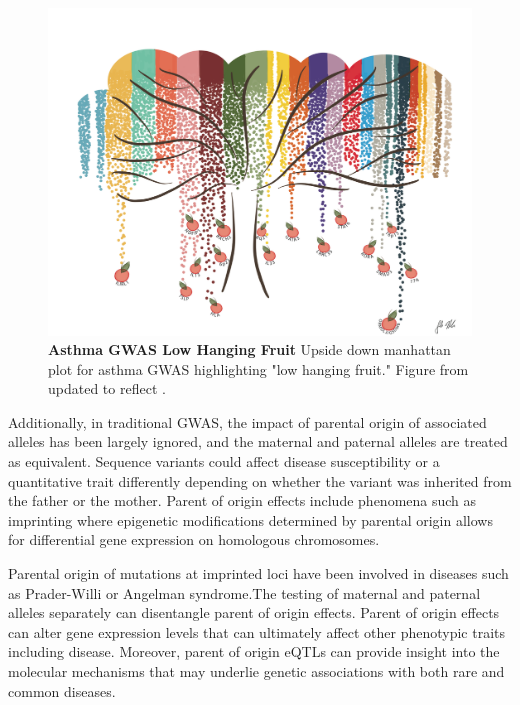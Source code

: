 \begin{figure}
\centering
\includegraphics[width=5in]{img/ch01/fig-01-lowhangingfruit.pdf}
\caption[Asthma GWAS Low Hanging Fruit.]{\textbf{Asthma GWAS Low Hanging Fruit} Upside down manhattan plot for asthma GWAS highlighting "low hanging fruit." Figure from \cite{Ober:2016ga} updated to reflect \cite{Demenais:2018hy}.}
\label{fig:fig-01-lowhangingfruit}
\end{figure}

Additionally, in traditional GWAS, the impact of parental origin of associated alleles has been largely ignored, and the maternal and paternal alleles are treated as equivalent. Sequence variants could affect disease susceptibility or a quantitative trait differently depending on whether the variant was inherited from the father or the mother. Parent of origin effects include phenomena such as imprinting where epigenetic modifications determined by parental origin allows for differential gene expression on homologous chromosomes\cite{Lokody2014,Lawson2013}. 

Parental origin of mutations at imprinted loci have been involved in diseases such as Prader-Willi or Angelman syndrome\cite{Lawson2013,Peters2014}.The testing of maternal and paternal alleles separately can disentangle parent of origin effects. Parent of origin effects can alter gene expression levels that can ultimately affect other phenotypic traits including disease. Moreover, parent of origin eQTLs can provide insight into the molecular mechanisms that may underlie genetic associations with both rare and common diseases\cite{Lawson2013,Peters2014,Kong:2009kk,Stridh2014,Falls1999}.

